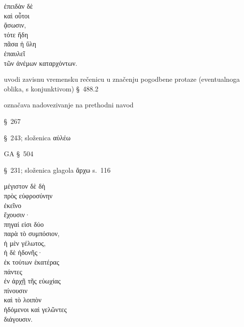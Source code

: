

{\large
\begin{greek}
\noindent ἐπειδὰν δὲ \\
καὶ οὗτοι \\
ᾄσωσιν, \\
τότε ἤδη \\
πᾶσα ἡ ὕλη\\
ἐπαυλεῖ \\
\tabto{2em} τῶν ἀνέμων καταρχόντων. \\

\end{greek}
}

\begin{description}[noitemsep]
\item[ἐπειδὰν] uvodi zavisnu vremensku rečenicu u značenju pogodbene protaze (eventualnoga oblika, s konjunktivom) §~488.2
\item[δὲ] označava nadovezivanje na prethodni navod
\item[ᾄσωσιν] §~267
\item[ἐπαυλεῖ] §~243; složenica αὐλέω
\item[τῶν ἀνέμων καταρχόντων] GA §~504
\item[καταρχόντων] §~231; složenica glagola ἄρχω s.~116
\end{description}



{\large
\begin{greek}
\noindent μέγιστον δὲ δὴ \\
\tabto{2em} πρὸς εὐφροσύνην \\
ἐκεῖνο \\
ἔχουσιν· \\
πηγαί εἰσι δύο \\
\tabto{2em} παρὰ τὸ συμπόσιον, \\

\noindent ἡ μὲν γέλωτος, \\
ἡ δὲ ἡδονῆς· \\
\tabto{2em} ἐκ τούτων ἑκατέρας\\
πάντες \\
\tabto{2em} ἐν ἀρχῇ τῆς εὐωχίας \\
πίνουσιν \\
καὶ τὸ λοιπὸν \\
ἡδόμενοι καὶ γελῶντες \\
διάγουσιν.\\

\end{greek}
}

